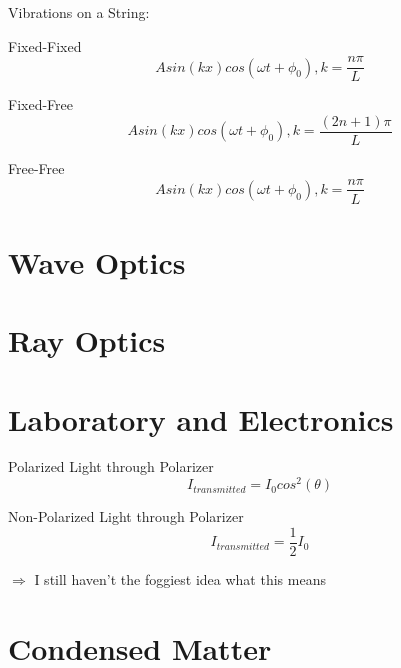 \documentclass{article}
\begin{document}
Vibrations on a String:

Fixed-Fixed\begin{equation}Asin(kx)cos(\omega t + \phi_0), k = \frac{n\pi}{L}\end{equation}

Fixed-Free\begin{equation}Asin(kx)cos(\omega t+\phi_0), k = \frac{(2n+1)\pi}{L}\end{equation}

Free-Free\begin{equation}Asin(kx)cos(\omega t + \phi_0), k= \frac{n\pi}{L}\end{equation}


\section{Wave Optics}








\section{Ray Optics}









\section{Laboratory and Electronics}
Polarized Light through Polarizer\begin{equation}I_{transmitted} = I_0cos^2(\theta)\end{equation}

Non-Polarized Light through Polarizer\begin{equation}I_{transmitted}=\frac{1}{2}I_0\end{equation}

$\Rightarrow$ I still haven't the foggiest idea what this means








\section{Condensed Matter}
\end{document}
